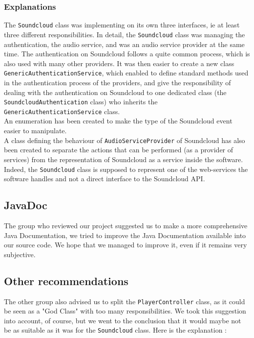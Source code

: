 \documentclass{report}
\begin{document}
\subsubsection{Explanations}
The \texttt{Soundcloud} class was implementing on its own three interfaces, ie at least three different responsibilities. In detail, the \texttt{Soundcloud} class was managing the authentication, the audio service, and was an audio service provider at the same time. The authentication on Soundcloud follows a quite common process, which is also used with many other providers. It was then easier to create a new class \texttt{GenericAuthenticationService}, which enabled to define standard methods used in the authentication process of the providers, and give the responsibility of dealing with the authentication on Soundcloud to one dedicated class (the \texttt{SoundcloudAuthentication} class) who inherits the \texttt{GenericAuthenticationService} class. \\
An enumeration has been created to make the type of the Soundcloud event easier to manipulate.\\
A class defining the behaviour of \texttt{AudioServiceProvider} of Soundcloud has also been created to separate the actions that can be performed (as a provider of services) from  the representation of Soundcloud as a service inside the software. Indeed, the \texttt{Soundcloud} class is supposed to represent one of the web-services the software handles and not a direct interface to the Soundcloud API.

\subsection{JavaDoc}
The group who reviewed our project suggested us to make a more comprehensive Java Documentation, we tried to improve the Java Documentation available into our source code. We hope that we managed to improve it, even if it remains very subjective.

\subsection{Other recommendations}
The other group also advised us to split the \texttt{PlayerController} class, as it could be seen as a "God Class" with too many responsibilities. We took this suggestion into account, of course, but we went to the conclusion that it would maybe not be as suitable as it was for the \texttt{Soundcloud} class. Here is the explanation :
\end{document}
